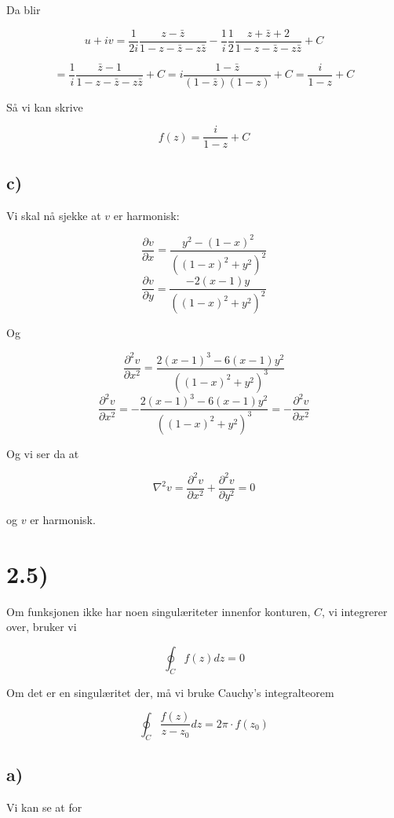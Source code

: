 \documentclass[a4paper,norsk, 10pt]{article}
\begin{document}
Da blir 

$$
u + iv = \frac{1}{2i}\frac{z-\bar{z}}{1 - z - \bar{z} - z\bar{z}} - \frac{1}{i}\frac{1}{2}\frac{z+\bar{z} + 2}{1 - z - \bar{z} - z\bar{z}} + C 
$$

$$
= \frac{1}{i}\frac{\bar{z}-1}{1 - z - \bar{z} - z\bar{z}} + C = i \frac{1-\bar{z}}{(1-\bar{z})(1-z)} +C = \frac{i}{1-z} + C
$$

Så vi kan skrive

$$
f(z) = \frac{i}{1-z} + C
$$

\subsection*{c)}
Vi skal nå sjekke at $v$ er harmonisk:

$$
\frac{\partial v}{\partial x} = \frac{y^2 -(1-x)^2}{((1-x)^2 + y^2)^2}
$$
$$
\frac{\partial v}{\partial y} = \frac{-2(x-1)y}{((1-x)^2 + y^2)^2}
$$

Og 

$$
\frac{\partial^2 v}{\partial x^2} = \frac{2(x-1)^3 -6(x-1)y^2}{((1-x)^2 + y^2)^3}
$$
$$
\frac{\partial^2 v}{\partial x^2} = -\frac{2(x-1)^3 -6(x-1)y^2}{((1-x)^2 + y^2)^3} = -\frac{\partial^2 v}{\partial x^2}
$$

Og vi ser da at

$$
\nabla^2 v = \frac{\partial^2 v}{\partial x^2} +\frac{\partial^2 v}{\partial y^2} =  0
$$

og $v$ er harmonisk.

\section*{2.5)}
Om funksjonen ikke har noen singulæriteter innenfor konturen, $C$, vi integrerer over, bruker vi

\begin{equation}
\oint_C f(z) dz = 0
\label{noSing}
\end{equation}

Om det er en singulæritet der, må vi bruke Cauchy's integralteorem

\begin{equation}
\oint_C \frac{f(z)}{z-z_0} dz= 2\pi\cdot f(z_0)
\label{Sing}
\end{equation}
\subsection*{a)}

Vi kan se at for 
\end{document}
